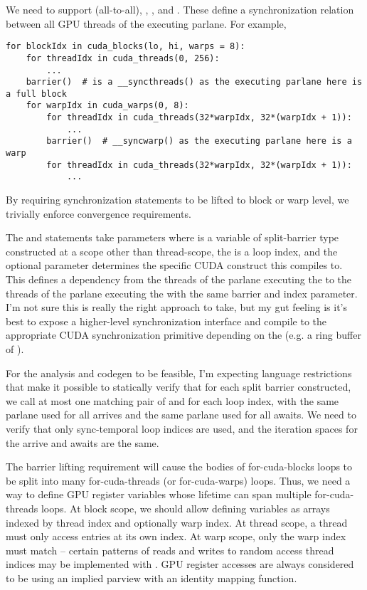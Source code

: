 \filbreak
{} We need to support  (all-to-all), , , and .
These define a synchronization relation between all GPU threads of the executing parlane.
For example,

\filbreak
{\color{lightttColor}
\begin{verbatim}
for blockIdx in cuda_blocks(lo, hi, warps = 8):
    for threadIdx in cuda_threads(0, 256):
        ...
    barrier()  # is a __syncthreads() as the executing parlane here is a full block
    for warpIdx in cuda_warps(0, 8):
        for threadIdx in cuda_threads(32*warpIdx, 32*(warpIdx + 1)):
            ...
        barrier()  # __syncwarp() as the executing parlane here is a warp
        for threadIdx in cuda_threads(32*warpIdx, 32*(warpIdx + 1)):
            ...
\end{verbatim}
}

By requiring synchronization statements to be lifted to block or warp level, we trivially enforce convergence requirements.

\filbreak
The  and  statements take parameters  where  is a variable of split-barrier type constructed at a scope other than thread-scope, the  is a loop index, and the optional  parameter determines the specific CUDA construct this compiles to.
This defines a dependency from the threads of the parlane executing the  to the threads of the parlane executing the  with the same barrier and index parameter.
I'm not sure this is really the right approach to take, but my gut feeling is it's best to expose a higher-level synchronization interface and compile to the appropriate CUDA synchronization primitive depending on the  (e.g. a ring buffer of \mbarrier).

\filbreak
{} For the analysis and codegen to be feasible, I'm expecting language restrictions that make it possible to statically verify that for each split barrier constructed, we call at most one matching pair of  and  for each loop index, with the same parlane used for all arrives and the same parlane used for all awaits.
We need to verify that only sync-temporal loop indices are used, and the iteration spaces for the arrive and awaits are the same.

\filbreak
{} The barrier lifting requirement will cause the bodies of for-cuda-blocks loops to be split into many for-cuda-threads (or for-cuda-warps) loops.
Thus, we need a way to define GPU register variables whose lifetime can span multiple for-cuda-threads loops.
At block scope, we should allow defining  variables as arrays indexed by thread index and optionally warp index.
At thread scope, a thread must only access entries at its own index.
At warp scope, only the warp index must match -- certain patterns of reads and writes to random access thread indices may be implemented with .
GPU register accesses are always considered to be using an implied parview with an identity mapping function.

